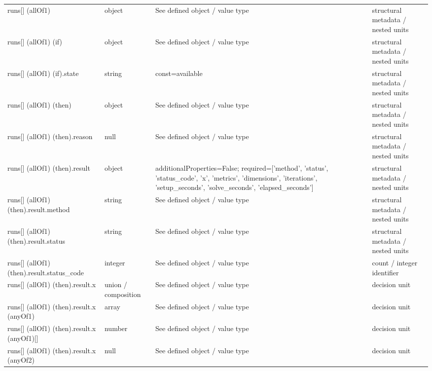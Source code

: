 \begin{longtable}{@{}>{\raggedright\arraybackslash}p{}>{\raggedright\arraybackslash}p{}>{\raggedright\arraybackslash}p{}>{\raggedright\arraybackslash}p{}@{}}
runs[] (allOf1) & object & See defined object /\allowbreak{} value type & structural metadata /\allowbreak{} nested units\\
runs[] (allOf1) (if) & object & See defined object /\allowbreak{} value type & structural metadata /\allowbreak{} nested units\\
runs[] (allOf1) (if).\allowbreak{}state & string & const=\allowbreak{}available & structural metadata /\allowbreak{} nested units\\
runs[] (allOf1) (then) & object & See defined object /\allowbreak{} value type & structural metadata /\allowbreak{} nested units\\
runs[] (allOf1) (then).\allowbreak{}reason & null & See defined object /\allowbreak{} value type & structural metadata /\allowbreak{} nested units\\
runs[] (allOf1) (then).\allowbreak{}result & object & additionalProperties=\allowbreak{}False; required=\allowbreak{}['method', 'status', 'status\_\allowbreak{}code', 'x', 'metrics', 'dimensions', 'iterations', 'setup\_\allowbreak{}seconds', 'solve\_\allowbreak{}seconds', 'elapsed\_\allowbreak{}seconds'] & structural metadata /\allowbreak{} nested units\\
runs[] (allOf1) (then).\allowbreak{}result.\allowbreak{}method & string & See defined object /\allowbreak{} value type & structural metadata /\allowbreak{} nested units\\
runs[] (allOf1) (then).\allowbreak{}result.\allowbreak{}status & string & See defined object /\allowbreak{} value type & structural metadata /\allowbreak{} nested units\\
runs[] (allOf1) (then).\allowbreak{}result.\allowbreak{}status\_\allowbreak{}code & integer & See defined object /\allowbreak{} value type & count /\allowbreak{} integer identifier\\
runs[] (allOf1) (then).\allowbreak{}result.\allowbreak{}x & union /\allowbreak{} composition & See defined object /\allowbreak{} value type & decision unit\\
runs[] (allOf1) (then).\allowbreak{}result.\allowbreak{}x (anyOf1) & array & See defined object /\allowbreak{} value type & decision unit\\
runs[] (allOf1) (then).\allowbreak{}result.\allowbreak{}x (anyOf1)[] & number & See defined object /\allowbreak{} value type & decision unit\\
runs[] (allOf1) (then).\allowbreak{}result.\allowbreak{}x (anyOf2) & null & See defined object /\allowbreak{} value type & decision unit\\

\end{longtable}
